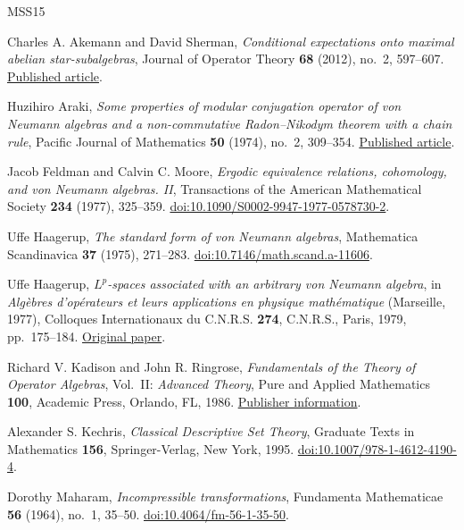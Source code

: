 \begin{thebibliography}{MSS15}
\raggedright

Charles A. Akemann and David Sherman,
\emph{Conditional expectations onto maximal abelian star-subalgebras},
Journal of Operator Theory \textbf{68} (2012), no.~2, 597--607.
\href{https://jot.theta.ro/jot/archive/2012-068-002/2012-068-002-013.pdf}{Published article}.

Huzihiro Araki,
\emph{Some properties of modular conjugation operator of von Neumann algebras and a non-commutative Radon--Nikodym theorem with a chain rule},
Pacific Journal of Mathematics \textbf{50} (1974), no.~2, 309--354.
\href{https://msp.org/pjm/1974/50-2/pjm-v50-n2-p02-p.pdf}{Published article}.

Jacob Feldman and Calvin C. Moore,
\emph{Ergodic equivalence relations, cohomology, and von Neumann algebras. II},
Transactions of the American Mathematical Society \textbf{234} (1977), 325--359.
\href{https://doi.org/10.1090/S0002-9947-1977-0578730-2}{doi:10.1090/S0002-9947-1977-0578730-2}.

Uffe Haagerup,
\emph{The standard form of von Neumann algebras},
Mathematica Scandinavica \textbf{37} (1975), 271--283.
\href{https://doi.org/10.7146/math.scand.a-11606}{doi:10.7146/math.scand.a-11606}.

Uffe Haagerup,
\emph{$L^p$-spaces associated with an arbitrary von Neumann algebra},
in \emph{Alg\`ebres d'op\'erateurs et leurs applications en physique math\'ematique}
(Marseille, 1977), Colloques Internationaux du C.N.R.S. \textbf{274},
C.N.R.S., Paris, 1979, pp.~175--184.
\href{https://math.berkeley.edu/~pavlov/scans/haagerup.pdf}{Original paper}.

Richard V. Kadison and John R. Ringrose,
\emph{Fundamentals of the Theory of Operator Algebras},
Vol.~II: \emph{Advanced Theory}, Pure and Applied Mathematics \textbf{100},
Academic Press, Orlando, FL, 1986.
\href{https://shop.elsevier.com/books/fundamentals-of-the-theory-of-operator-algebras-v2/kadison/978-0-12-393302-7}{Publisher information}.

Alexander S. Kechris,
\emph{Classical Descriptive Set Theory},
Graduate Texts in Mathematics \textbf{156}, Springer-Verlag, New York, 1995.
\href{https://doi.org/10.1007/978-1-4612-4190-4}{doi:10.1007/978-1-4612-4190-4}.

Dorothy Maharam,
\emph{Incompressible transformations},
Fundamenta Mathematicae \textbf{56} (1964), no.~1, 35--50.
\href{https://doi.org/10.4064/fm-56-1-35-50}{doi:10.4064/fm-56-1-35-50}.


\end{thebibliography}
